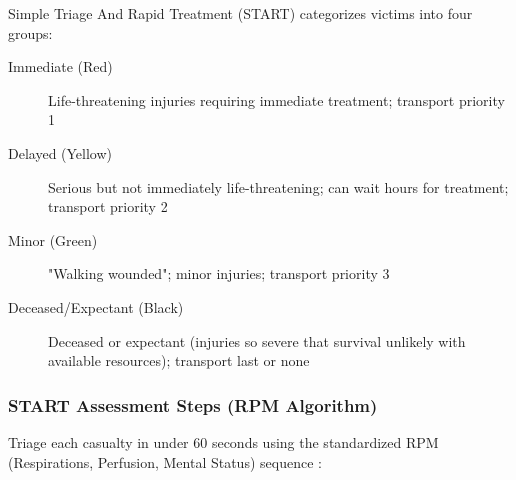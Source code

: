 Simple Triage And Rapid Treatment (START) categorizes victims into four groups:

\begin{description}
  \item[Immediate (Red)] Life-threatening injuries requiring immediate treatment; transport priority 1
  \item[Delayed (Yellow)] Serious but not immediately life-threatening; can wait hours for treatment; transport priority 2
  \item[Minor (Green)] "Walking wounded"; minor injuries; transport priority 3
  \item[Deceased/Expectant (Black)] Deceased or expectant (injuries so severe that survival unlikely with available resources); transport last or none
\end{description}

\subsubsection{START Assessment Steps (RPM Algorithm)}

Triage each casualty in under 60 seconds using the standardized RPM (Respirations, Perfusion, Mental Status) sequence \cite{who_mtbs}:

